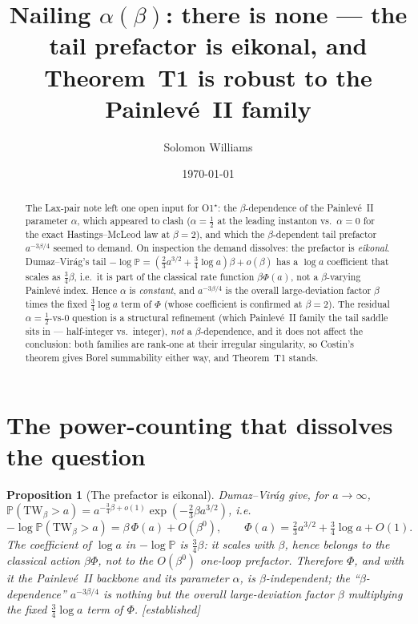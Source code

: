 \documentclass[11pt,reqno]{amsart}
\theoremstyle{plain}
\newtheorem{proposition}{Proposition}
\theoremstyle{remark}
\newcommand{\Prob}{\mathbb{P}}
\newcommand{\OK}{{\footnotesize\textsf{[established]}}}
\begin{document}
\title[There is no $\alpha(\beta)$]{Nailing $\alpha(\beta)$: there is none --- the tail prefactor
is eikonal, and Theorem~T1 is robust to the Painlev\'e~II family}
\author{Solomon Williams}
\date{\today}

\begin{abstract}
The Lax-pair note left one open input for O1$^\star$: the $\beta$-dependence of the Painlev\'e~II
parameter $\alpha$, which appeared to clash ($\alpha=\tfrac12$ at the leading instanton vs.\
$\alpha=0$ for the exact Hastings--McLeod law at $\beta=2$), and which the $\beta$-dependent tail
prefactor $a^{-3\beta/4}$ seemed to demand. On inspection the demand dissolves: the prefactor is
\emph{eikonal}. Dumaz--Vir\'ag's tail $-\log\Prob=(\tfrac23 a^{3/2}+\tfrac34\log a)\beta+o(\beta)$
has a $\log a$ coefficient that scales as $\tfrac34\beta$, i.e.\ it is part of the classical rate
function $\beta\Phi(a)$, not a $\beta$-varying Painlev\'e index. Hence $\alpha$ is \emph{constant},
and $a^{-3\beta/4}$ is the overall large-deviation factor $\beta$ times the fixed
$\tfrac34\log a$ term of $\Phi$ (whose coefficient is confirmed at $\beta=2$). The residual
$\alpha=\tfrac12$-vs-$0$ question is a structural refinement (which Painlev\'e~II family the tail
saddle sits in --- half-integer vs.\ integer), \emph{not} a $\beta$-dependence, and it does not
affect the conclusion: both families are rank-one at their irregular singularity, so Costin's
theorem gives Borel summability either way, and Theorem~T1 stands.
\end{abstract}

\maketitle

\section{The power-counting that dissolves the question}

\begin{proposition}[The prefactor is eikonal]\label{prop:eikonal}
Dumaz--Vir\'ag \cite{DV} give, for $a\to\infty$,
$\Prob(\mathrm{TW}_\beta>a)=a^{-\frac34\beta+o(1)}\exp(-\tfrac23\beta a^{3/2})$, i.e.
\[
-\log\Prob(\mathrm{TW}_\beta>a)=\beta\,\Phi(a)+O(\beta^0),\qquad
\Phi(a)=\tfrac23 a^{3/2}+\tfrac34\log a+O(1).
\]
The coefficient of $\log a$ in $-\log\Prob$ is $\tfrac34\beta$: it \emph{scales with $\beta$},
hence belongs to the classical action $\beta\Phi$, not to the $O(\beta^0)$ one-loop prefactor.
Therefore $\Phi$, and with it the Painlev\'e~II backbone and its parameter $\alpha$, is
\emph{$\beta$-independent}; the ``$\beta$-dependence'' $a^{-3\beta/4}$ is nothing but the overall
large-deviation factor $\beta$ multiplying the fixed $\tfrac34\log a$ term of $\Phi$. \OK
\end{proposition}
\end{document}

